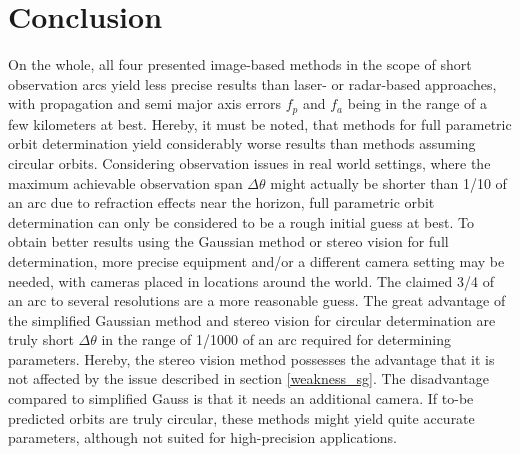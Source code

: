\documentclass[11pt,a4paper]{article}
\begin{document}
	
	\section{Conclusion}
	On the whole, all four presented image-based methods in the scope of short observation arcs yield less precise results than laser- or radar-based approaches, with propagation and semi major axis errors $f_p$ and $f_a$ being in the range of a few kilometers at best. Hereby, it must be noted, that methods for full parametric orbit determination yield considerably worse results than methods assuming circular orbits. Considering observation issues in real world settings, where the maximum achievable observation span $\Delta \theta$ might actually be shorter than 1/10 of an arc due to refraction effects near the horizon, full parametric orbit determination can only be considered to be a rough initial guess at best. To obtain better results using the Gaussian method or stereo vision for full determination, more precise equipment and/or a different camera setting may be needed, with cameras placed in locations around the world. The claimed 3/4 of an arc to several resolutions \cite{semi_major_axis_knowledge} are a more reasonable guess.\newline
	The great advantage of the simplified Gaussian method and stereo vision for circular determination are truly short $\Delta \theta$ in the range of 1/1000 of an arc required for determining parameters. Hereby, the stereo vision method possesses the advantage that it is not affected by the issue described in section \ref{weakness_sg}. The disadvantage compared to simplified Gauss is that it needs an additional camera. If to-be predicted orbits are truly circular, these methods might yield quite accurate parameters, although not suited for high-precision applications.
	
\end{document}
